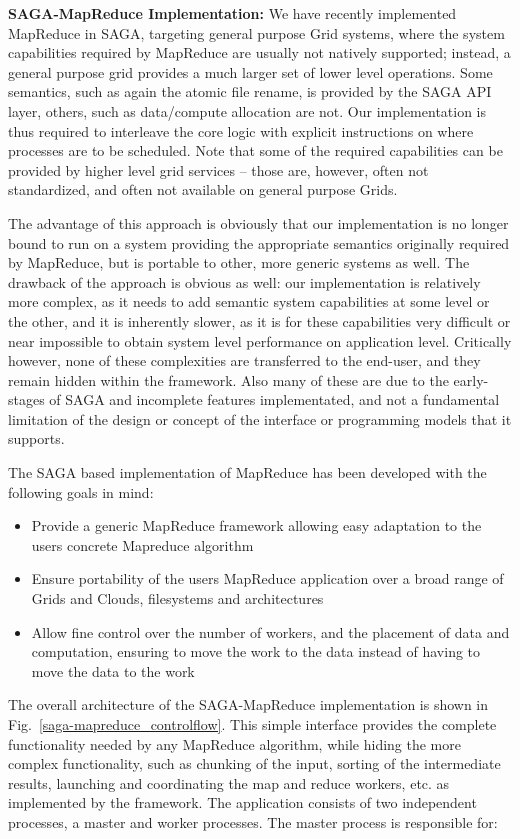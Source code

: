\documentclass[conference,final]{IEEEtran}
\begin{document}
{\bf SAGA-MapReduce Implementation:} We have recently implemented
MapReduce in SAGA, targeting general purpose Grid systems, where the
system capabilities required by MapReduce are usually not natively
supported; instead, a general purpose grid provides a much larger set
of lower level operations.  Some semantics, such as again the atomic
file rename, is provided by the SAGA API layer, others, such as
data/compute allocation are not.  Our implementation is thus required
to interleave the core logic with explicit instructions on where
processes are to be scheduled.  Note that some of the required
capabilities can be provided by higher level grid services -- those
are, however, often not standardized, and often not available on
general purpose Grids.

The advantage of this approach is obviously that our implementation is
no longer bound to run on a system providing the appropriate semantics
originally required by MapReduce, but is portable to other, more
generic systems as well.  The drawback of the approach is obvious as
well: our implementation is relatively more complex, as it needs to
add semantic system capabilities at some level or the other, and it is
inherently slower, as it is for these capabilities very difficult or
near impossible to obtain system level performance on application
level.  Critically however, none of these complexities are transferred
to the end-user, and they remain hidden within the framework. Also
many of these are due to the early-stages of SAGA and incomplete
features implementated, and not a fundamental limitation of the design
or concept of the interface or programming models that it supports.

The SAGA based implementation of MapReduce has been developed with the
following goals in mind:

\begin{itemize}
\item Provide a generic MapReduce framework allowing easy
  adaptation to the users concrete Mapreduce algorithm
\item Ensure portability of the users MapReduce application over a
  broad range of Grids and Clouds, filesystems and architectures
\item Allow fine control over the number of workers, and the
  placement of data and computation, ensuring to move the work to the
  data instead of having to move the data to the work
\end{itemize}

The overall architecture of the SAGA-MapReduce implementation is shown
in Fig.~\ref{saga-mapreduce_controlflow}. This simple interface
provides the complete functionality needed by any MapReduce algorithm,
while hiding the more complex functionality, such as chunking of the
input, sorting of the intermediate results, launching and coordinating
the map and reduce workers, etc. as implemented by the framework.  The
application consists of two independent processes, a master and worker
processes. The master process is responsible for:
\end{document}
